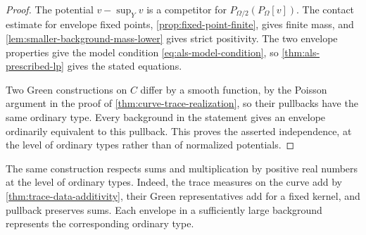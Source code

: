 \begin{proof}
The potential $v-\sup_Yv$ is a competitor for $P_{\Omega/2}(P_\Omega[v])$. The contact estimate for envelope fixed points, \cref{prop:fixed-point-finite}, gives finite mass, and \cref{lem:smaller-background-mass-lower} gives strict positivity. The two envelope properties give the model condition \eqref{eq:als-model-condition}, so \cref{thm:als-prescribed-lp} gives the stated equations.

Two Green constructions on $C$ differ by a smooth function, by the Poisson argument in the proof of \cref{thm:curve-trace-realization}, so their pullbacks have the same ordinary type. Every background in the statement gives an envelope ordinarily equivalent to this pullback. This proves the asserted independence, at the level of ordinary types rather than of normalized potentials.
\end{proof}

The same construction respects sums and multiplication by positive real numbers at the level of ordinary types. Indeed, the trace measures on the curve add by \cref{thm:trace-data-additivity}, their Green representatives add for a fixed kernel, and pullback preserves sums. Each envelope in a sufficiently large background represents the corresponding ordinary type.
